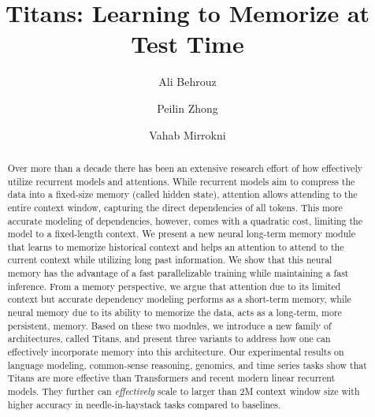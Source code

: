 \documentclass{article}
\title{Titans: Learning to Memorize at Test Time}
\author[$^\dagger$]{Ali Behrouz}
\author[$^\dagger$]{Peilin Zhong}
\author[$^\dagger$]{Vahab Mirrokni}
\affil[$^\dagger$]{Google Research}
\affil[ ]{{\small \texttt{\{alibehrouz, peilinz, mirrokni\}@google.com}}}
\date{}
\begin{document}
\maketitle


\begin{abstract}
  Over more than a decade there has been an extensive research effort of how effectively utilize recurrent models and attentions. While recurrent models aim to compress the data into a fixed-size memory (called hidden state), attention allows attending to the entire context window, capturing the direct dependencies of all tokens. This more accurate modeling of dependencies, however, comes with a quadratic cost, limiting the model to a fixed-length context. We present a new neural long-term memory module that learns to memorize historical context and helps an attention to attend to the current context while utilizing long past information. We show that this neural memory has the advantage of a fast parallelizable training while maintaining a fast inference. From a memory perspective, we argue that attention due to its limited context but accurate dependency modeling performs as a short-term memory, while neural memory due to its ability to memorize the data, acts as a long-term, more persistent, memory. Based on these two modules, we introduce a new family of architectures, called Titans, and present three variants to address how one can effectively incorporate memory into this architecture. Our experimental results on language modeling, common-sense reasoning, genomics, and time series tasks show that Titans are more effective than Transformers and recent modern linear recurrent models. They further can \emph{effectively} scale to larger than 2M context window size with higher accuracy in needle-in-haystack tasks compared to baselines.
\end{abstract}












\newpage
\printbibliography

\appendix






\end{document}
